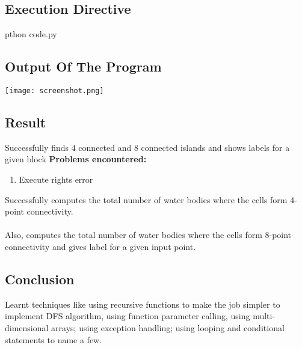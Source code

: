 \documentclass[paper=a4, fontsize=11pt]{scrartcl} %
\numberwithin{equation}{section} %
\numberwithin{figure}{section} %
\numberwithin{table}{section} %
\begin{document}
\subsection{Execution Directive}
pthon code.py

\subsection{Output Of The Program}
\texttt{[image: screenshot.png]}\\

\subsection{Result}

Successfully finds 4 connected and 8 connected islands and shows labels for a given block
\textbf{Problems encountered:}
\begin{enumerate}
\item Execute rights error
\end{enumerate}


Successfully computes the total number of water bodies where the cells form 4-point connectivity.\\
\\
Also, computes the total number of water bodies where the cells form 8-point connectivity and gives label for a given input point.\\

\subsection{Conclusion}
Learnt techniques like using recursive functions to make the job simpler to implement DFS algorithm, using function parameter calling, using multi-dimensional arrays; using exception handling; using looping and conditional statements to name a few.\\
\end{document}
